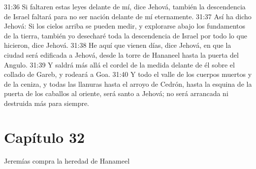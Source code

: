 31:36 Si faltaren estas leyes delante de mí, dice Jehová, también la descendencia de Israel faltará para no ser nación delante de mí eternamente. 
31:37 Así ha dicho Jehová: Si los cielos arriba se pueden medir, y explorarse abajo los fundamentos de la tierra, también yo desecharé toda la descendencia de Israel por todo lo que hicieron, dice Jehová. 
31:38 He aquí que vienen días, dice Jehová, en que la ciudad será edificada a Jehová, desde la torre de Hananeel hasta la puerta del Angulo. 
31:39 Y saldrá más allá el cordel de la medida delante de él sobre el collado de Gareb, y rodeará a Goa. 
31:40 Y todo el valle de los cuerpos muertos y de la ceniza, y todas las llanuras hasta el arroyo de Cedrón, hasta la esquina de la puerta de los caballos al oriente, será santo a Jehová; no será arrancada ni destruida más para siempre. 
\section*{Capítulo 32 }
Jeremías compra la heredad de Hanameel 
 
